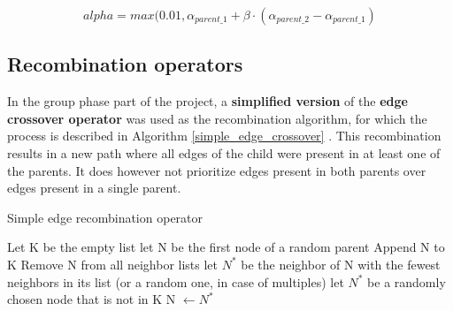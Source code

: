 \documentclass[a4paper,10pt]{article}
\newcommand{\ReplaceMe}[1]{{\color{blue}#1}}
\begin{document}
\begin{equation}
    \label{crossover_alpha_2}
    alpha = max(0.01, \alpha_{parent\_1} + \beta \cdot (\alpha_{parent\_2} - \alpha_{parent\_1})
\end{equation}

\subsection{Recombination operators}
\label{recombination}

In the group phase part of the project, a \textbf{simplified version} of the \textbf{edge crossover operator} was used as the recombination algorithm, for which the process is described in Algorithm \ref{simple_edge_crossover} \cite{initial_implementation_edge_crossover}. This recombination results in a new path where all edges of the child were present in at least one of the parents. It does however not prioritize edges present in both parents over edges present in a single parent.

\begin{algorithm}
\caption{Simple edge recombination operator}\label{simple_edge_crossover}
\begin{algorithmic}
\State Let K be the empty list
\State let N be the first node of a random parent
\State Append N to K
\State Remove N from all neighbor lists
\State let $N^*$ be the neighbor of N with the fewest neighbors in its list (or a random one, in case of multiples)
\Else 
\State let $N^*$ be a randomly chosen node that is not in K
\EndIf
\State N $\gets N^*$
\EndWhile
\end{algorithmic}
\end{algorithm}
\end{document}
